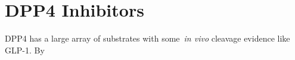 \section{DPP4 Inhibitors}
DPP4 has a large array of substrates with some~\textit{in vivo} cleavage evidence like GLP-1. By